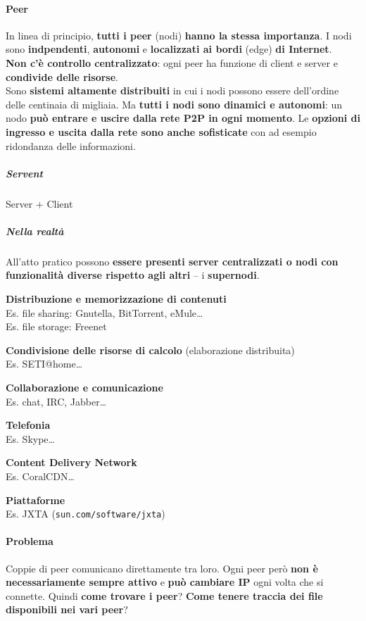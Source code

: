\documentclass[10pt]{article}
\begin{document}
\paragraph{Peer} In linea di principio, \textbf{tutti i peer} (nodi) \textbf{hanno la stessa importanza}. I nodi sono \textbf{indpendenti}, \textbf{autonomi} e \textbf{localizzati ai bordi} (edge) \textbf{di Internet}.\\
\textbf{Non c'è controllo centralizzato}: ogni peer ha funzione di client e server e \textbf{condivide delle risorse}.\\
Sono \textbf{sistemi altamente distribuiti} in cui i nodi possono essere dell'ordine delle centinaia di migliaia. Ma \textbf{tutti i nodi sono dinamici e autonomi}: un nodo \textbf{può entrare e uscire dalla rete P2P in ogni momento}. Le \textbf{opzioni di ingresso e uscita dalla rete sono anche sofisticate} con ad esempio ridondanza delle informazioni.
\subparagraph{Servent} Server + Client
\subparagraph{Nella realtà} All'atto pratico possono \textbf{essere presenti server centralizzati o nodi con funzionalità diverse rispetto agli altri} -- i \textbf{supernodi}.
\begin{list}{}{Esempi di applicazioni:}
	\item \textbf{Distribuzione e memorizzazione di contenuti}\\
	Es. file sharing: Gnutella, BitTorrent, eMule\ldots\\
	Es. file storage: Freenet
	\item \textbf{Condivisione delle risorse di calcolo} (elaborazione distribuita)\\
	Es. SETI@home\ldots
	\item \textbf{Collaborazione e comunicazione}\\
	Es. chat, IRC, Jabber\ldots
	\item \textbf{Telefonia}\\
	Es. Skype\ldots
	\item \textbf{Content Delivery Network}\\
	Es. CoralCDN\ldots
	\item \textbf{Piattaforme}\\
	Es. JXTA (\texttt{sun.com/software/jxta})
\end{list}
\pagebreak
\paragraph{Problema} Coppie di peer comunicano direttamente tra loro. Ogni peer però \textbf{non è necessariamente sempre attivo} e \textbf{può cambiare IP} ogni volta che si connette. Quindi \textbf{come trovare i peer}? \textbf{Come tenere traccia dei file disponibili nei vari peer}?
\end{document}
